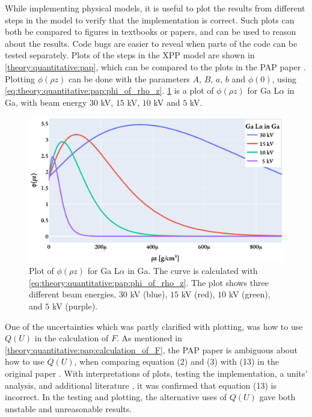 While implementing physical models, it is useful to plot the results from different steps in the model to verify that the implementation is correct.
Such plots can both be compared to figures in textbooks or papers, and can be used to reason about the results.
Code bugs are easier to reveal when parts of the code can be tested separately.
Plots of the steps in the XPP model are shown in \cref{theory:quantitative:pap}, which can be compared to the plots in the PAP paper \cite{pap_1991}.
Plotting $\phi(\rho z)$ can be done with the parameters $A$, $B$, $a$, $b$ and $\phi(0)$, using \cref{eq:theory:quantitative:pap:phi_of_rho_z}.
\cref{fig:discussion:pap:phi_of_rhoz} is a plot of $\phi(\rho z)$ for Ga L$\alpha$ in Ga, with beam energy $30$ kV, $15$ kV, $10$ kV and $5$ kV.

\begin{figure}[htbp]
    \centering
    \includegraphics[width=0.8\linewidth]{figures/discussion/PAP_phi_of_rhoz.pdf}
    \caption{
        Plot of $\phi(\rho z)$ for Ga L$\alpha$ in Ga.
        The curve is calculated with \cref{eq:theory:quantitative:pap:phi_of_rho_z}.
        The plot shows three different beam energies, $30$ kV (blue), $15$ kV (red), $10$ kV (green), and $5$ kV (purple).
    }
    \label{fig:discussion:pap:phi_of_rhoz}
\end{figure}

One of the uncertainties which was partly clarified with plotting, was how to use $Q(U)$ in the calculation of $F$.
As mentioned in \cref{theory:quantitative:pap:calculation_of_F}, the PAP paper is ambiguous about how to use $Q(U)$, when comparing equation (2) and (3) with (13) in the original paper \cite{pap_1991}.
With interpretations of plots, testing the implementation, a units' analysis, and additional literature \cite{goldstein_scanning_2018,reimer_sem}, it was confirmed that equation (13) is incorrect.
In the testing and plotting, the alternative uses of $Q(U)$ gave both unstable and unreasonable results.


